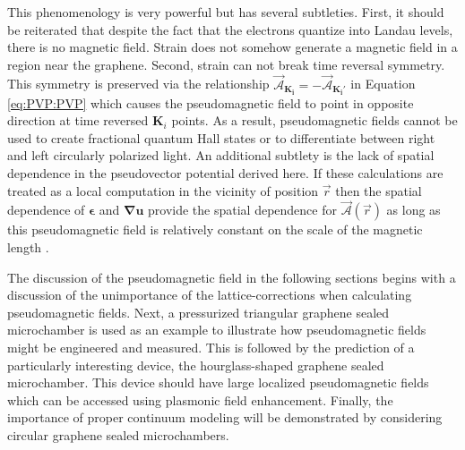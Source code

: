 This phenomenology is very powerful but has several subtleties.
First, it should be reiterated that despite the fact that the electrons quantize into Landau levels, there is no magnetic field.
Strain does not somehow generate a magnetic field in a region near the graphene.
Second, strain can not break time reversal symmetry.
This symmetry is preserved via the relationship $\vec{\mathcal{A}}_{\bm{K_i}} = - \vec{\mathcal{A}}_{\bm{K_i'}}$ in Equation \ref{eq:PVP:PVP} which causes the pseudomagnetic field to point in opposite direction at time reversed $\bm{K}_i$ points.
As a result, pseudomagnetic fields cannot be used to create fractional quantum Hall states or to differentiate between right and left circularly polarized light.
An additional subtlety is the lack of spatial dependence in the pseudovector potential derived here.
If these calculations are treated as a local computation in the vicinity of position $\vec{r}$ then the spatial dependence of $\bm{\epsilon}$ and $\bm{\nabla u}$ provide the spatial dependence for $\vec{\mathcal{A}}(\vec{r})$ as long as this pseudomagnetic field is relatively constant on the scale of the magnetic length \cite{CastroNeto2009}.

The discussion of the pseudomagnetic field in the following sections begins with a discussion of the unimportance of the lattice-corrections when calculating pseudomagnetic fields.
Next, a pressurized triangular graphene sealed microchamber \cite{Guinea2009} is used as an example to illustrate how pseudomagnetic fields might be engineered and measured.
This is followed by the prediction of a particularly interesting device, the hourglass-shaped graphene sealed microchamber.
This device should have large localized pseudomagnetic fields which can be accessed using plasmonic field enhancement.
Finally, the importance of proper continuum modeling will be demonstrated by considering circular graphene sealed microchambers.

